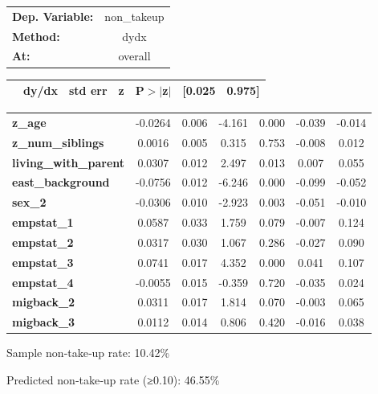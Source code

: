 \begin{center}
\begin{tabular}{lc}
\toprule
\textbf{Dep. Variable:}       &  non\_takeup    \\
\textbf{Method:}              &      dydx       \\
\textbf{At:}                  &    overall      \\
\bottomrule
\end{tabular}
\begin{tabular}{ccccccc}
          \textbf{}           & \textbf{dy/dx} & \textbf{std err} & \textbf{z} & \textbf{P$> |$z$|$} & \textbf{[0.025} & \textbf{0.975]}  \\
\midrule
\bottomrule
\end{tabular}
\begin{tabular}{lcccccc}
\textbf{z\_age}               &      -0.0264   &        0.006     &    -4.161  &         0.000        &       -0.039    &       -0.014     \\
\textbf{z\_num\_siblings}     &       0.0016   &        0.005     &     0.315  &         0.753        &       -0.008    &        0.012     \\
\textbf{living\_with\_parent} &       0.0307   &        0.012     &     2.497  &         0.013        &        0.007    &        0.055     \\
\textbf{east\_background}     &      -0.0756   &        0.012     &    -6.246  &         0.000        &       -0.099    &       -0.052     \\
\textbf{sex\_2}               &      -0.0306   &        0.010     &    -2.923  &         0.003        &       -0.051    &       -0.010     \\
\textbf{empstat\_1}           &       0.0587   &        0.033     &     1.759  &         0.079        &       -0.007    &        0.124     \\
\textbf{empstat\_2}           &       0.0317   &        0.030     &     1.067  &         0.286        &       -0.027    &        0.090     \\
\textbf{empstat\_3}           &       0.0741   &        0.017     &     4.352  &         0.000        &        0.041    &        0.107     \\
\textbf{empstat\_4}           &      -0.0055   &        0.015     &    -0.359  &         0.720        &       -0.035    &        0.024     \\
\textbf{migback\_2}           &       0.0311   &        0.017     &     1.814  &         0.070        &       -0.003    &        0.065     \\
\textbf{migback\_3}           &       0.0112   &        0.014     &     0.806  &         0.420        &       -0.016    &        0.038     \\
\bottomrule
\end{tabular}
\end{center}

Sample non‑take‑up rate:          10.42\%

Predicted non‑take‑up rate (≥0.10): 46.55\%
